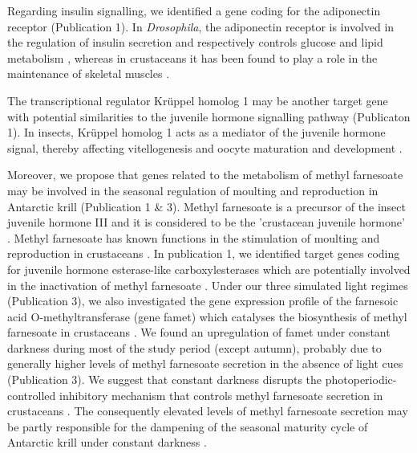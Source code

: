 Regarding insulin signalling, we identified a gene coding for the adiponectin
receptor (Publication 1). In \textit{Drosophila}, the adiponectin receptor is
involved in the regulation of insulin secretion and respectively controls
glucose and lipid metabolism \citep{kwak_drosophila_2013}, whereas in crustaceans it has
been found to play a role in the maintenance of skeletal muscles \citep{kim_molecular_2016}.

The transcriptional regulator Krüppel homolog 1 may be another target gene with
potential similarities to the juvenile hormone signalling pathway (Publicaton
1). In insects, Krüppel homolog 1 acts as a mediator of the  juvenile hormone
signal, thereby affecting vitellogenesis and oocyte maturation
\citep{song_kruppel-homolog_2014} and development \citep{minakuchi_kruppel_2008}.

Moreover, we propose that genes related to the metabolism of methyl farnesoate
may be involved in the seasonal regulation of moulting and reproduction in
Antarctic krill (Publication 1 \& 3). Methyl farnesoate is a precursor of the
insect juvenile hormone III and it is considered to be the 'crustacean juvenile
hormone' \citep{homola_methyl_1997}. Methyl farnesoate has known functions in
the stimulation of moulting and reproduction in crustaceans
\citep{reddy_involvement_2004}.  In publication 1, we identified target genes
coding for juvenile hormone esterase-like carboxylesterases which are
potentially involved in the inactivation of methyl farnesoate
\citep{lee_two_2011}. Under our three simulated light regimes (Publication 3),
we also investigated the gene expression profile of the farnesoic acid
O-methyltransferase (gene famet) which catalyses the biosynthesis of methyl
farnesoate in crustaceans \citep{gunawardene_function_2002}. We found an
upregulation of famet under constant darkness during most of the study period
(except autumn), probably due to generally higher levels of methyl farnesoate
secretion in the absence of light cues (Publication 3). We suggest that
constant darkness disrupts the photoperiodic-controlled inhibitory mechanism
that controls methyl farnesoate secretion in crustaceans
\citep{swetha_reproductive_2011, tsukimura_regulation_1992}. The consequently
elevated levels of methyl farnesoate secretion may be partly responsible for
the dampening of the seasonal maturity cycle of Antarctic krill under constant
darkness \citep{horing_light_2018}.

